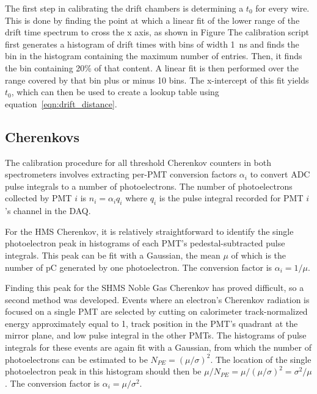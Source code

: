 The first step in calibrating the drift chambers is determining a $t_0$ for
every wire.
This is done by finding the point at which a linear fit of the lower range of
the drift time spectrum to cross the x axis, as shown in Figure %
The calibration script first generates a histogram of drift times with bins of
width \SI{1}{\nano\second}
and finds the bin in the histogram containing the maximum number of entries.
Then, it finds the bin containing 20\% of that content.
A linear fit is then performed over the range covered by that bin plus or minus
10 bins.
The x-intercept of this fit yields $t_0$, which can then be used to create a
lookup table using equation~\ref{eqn:drift_distance}.



\subsection{Cherenkovs}

The calibration procedure for all threshold Cherenkov counters in both
spectrometers involves extracting per-PMT conversion factors $\alpha_i$ to
convert ADC pulse integrals to a number of photoelectrons.
The number of photoelectrons collected by PMT $i$ is $n_i=\alpha_iq_i$ where
$q_i$ is the pulse integral recorded for PMT $i$'s channel in the DAQ.


For the HMS Cherenkov, it is relatively straightforward to identify the single
photoelectron peak in histograms of each PMT's pedestal-subtracted pulse
integrals.
This peak can be fit with a Gaussian, the mean $\mu$ of which is the number of
\si{\pico\coulomb} generated by one photoelectron.
The conversion factor is $\alpha_i=1/\mu$.


Finding this peak for the SHMS Noble Gas Cherenkov has proved difficult, so a
second method was developed.
Events where an electron's Cherenkov radiation is focused on a single PMT are
selected by cutting on
calorimeter track-normalized energy approximately equal to 1,
track position in the PMT's quadrant at the mirror plane,
and low pulse integral in the other PMTs.
The histograms of pulse integrals for these events are again fit with a
Gaussian, from which the number of photoelectrons can be estimated to be
$N_{PE}=(\mu/\sigma)^2$.
The location of the single photoelectron peak in this histogram should then
be $\mu/N_{PE}=\mu/(\mu/\sigma)^2=\sigma^2/\mu$.
The conversion factor is $\alpha_i=\mu/\sigma^2$.


